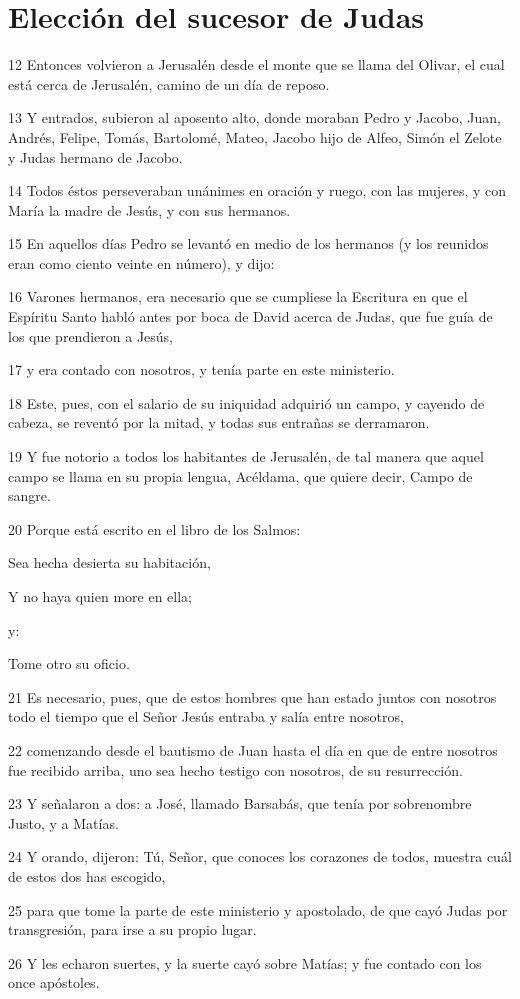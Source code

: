 \section*{Elección del sucesor de Judas}

\par 12 Entonces volvieron a Jerusalén desde el monte que se llama del Olivar, el cual está cerca de Jerusalén, camino de un día de reposo.
\par 13 Y entrados, subieron al aposento alto, donde moraban Pedro y Jacobo, Juan, Andrés, Felipe, Tomás, Bartolomé, Mateo, Jacobo hijo de Alfeo, Simón el Zelote y Judas hermano de Jacobo.
\par 14 Todos éstos perseveraban unánimes en oración y ruego, con las mujeres, y con María la madre de Jesús, y con sus hermanos.
\par 15 En aquellos días Pedro se levantó en medio de los hermanos (y los reunidos eran como ciento veinte en número), y dijo:
\par 16 Varones hermanos, era necesario que se cumpliese la Escritura en que el Espíritu Santo habló antes por boca de David acerca de Judas, que fue guía de los que prendieron a Jesús,
\par 17 y era contado con nosotros, y tenía parte en este ministerio.
\par 18 Este, pues, con el salario de su iniquidad adquirió un campo, y cayendo de cabeza, se reventó por la mitad, y todas sus entrañas se derramaron.
\par 19 Y fue notorio a todos los habitantes de Jerusalén, de tal manera que aquel campo se llama en su propia lengua, Acéldama, que quiere decir, Campo de sangre.
\par 20 Porque está escrito en el libro de los Salmos:
\par Sea hecha desierta su habitación,
\par Y no haya quien more en ella;
\par y:
\par Tome otro su oficio.
\par 21 Es necesario, pues, que de estos hombres que han estado juntos con nosotros todo el tiempo que el Señor Jesús entraba y salía entre nosotros,
\par 22 comenzando desde el bautismo de Juan hasta el día en que de entre nosotros fue recibido arriba, uno sea hecho testigo con nosotros, de su resurrección.
\par 23 Y señalaron a dos: a José, llamado Barsabás, que tenía por sobrenombre Justo, y a Matías.
\par 24 Y orando, dijeron: Tú, Señor, que conoces los corazones de todos, muestra cuál de estos dos has escogido,
\par 25 para que tome la parte de este ministerio y apostolado, de que cayó Judas por transgresión, para irse a su propio lugar.
\par 26 Y les echaron suertes, y la suerte cayó sobre Matías; y fue contado con los once apóstoles.

